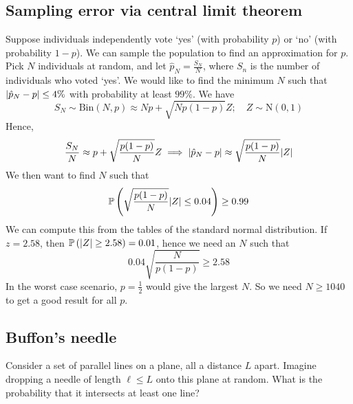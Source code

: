 \subsection{Sampling error via central limit theorem}
Suppose individuals independently vote `yes' (with probability \(p\)) or `no' (with probability \(1-p\)).
We can sample the population to find an approximation for \(p\).
Pick \(N\) individuals at random, and let \(\hat{p}_N = \frac{S_N}{N}\), where \(S_n\) is the number of individuals who voted `yes'.
We would like to find the minimum \(N\) such that \(\abs{\hat{p}_N - p} \leq 4\%\) with probability at least \(99\%\).
We have
\[
	S_N \sim \mathrm{Bin}(N, p) \approx Np + \sqrt{Np(1-p)}Z;\quad Z \sim \mathrm{N}(0, 1)
\]
Hence,
\[
	\frac{S_N}{N} \approx p + \sqrt{\frac{p(1-p)}{N}}Z \implies \abs{\hat{p}_N - p} \approx \sqrt{\frac{p(1-p)}{N}}\abs{Z}
\]
We then want to find \(N\) such that
\[
	\mathbb{P}\left({\sqrt{\frac{p(1-p)}{N}}\abs{Z} \leq 0.04}\right) \geq 0.99
\]
We can compute this from the tables of the standard normal distribution.
If \(z = 2.58\), then \(\mathbb{P}\left({\abs{Z} \geq 2.58}\right) = 0.01\), hence we need an \(N\) such that
\[
	0.04 \sqrt{\frac{N}{p(1-p)}} \geq 2.58
\]
In the worst case scenario, \(p = \frac{1}{2}\) would give the largest \(N\).
So we need \(N \geq 1040\) to get a good result for all \(p\).

\subsection{Buffon's needle}
Consider a set of parallel lines on a plane, all a distance \(L\) apart.
Imagine dropping a needle of length \(\ell \leq L\) onto this plane at random.
What is the probability that it intersects at least one line?

